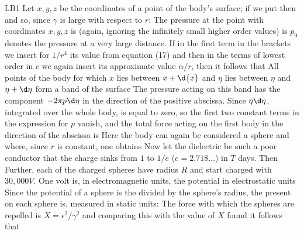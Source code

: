 \begin{paper}{LB1}
Let $x,y,z$ be the coordinates of a point of the body's surface; if we put
then
and so, since $\gamma$ is large with respect to $r$:
The pressure at the point with coordinates $x,y,z$ is (again, ignoring the infinitely small higher order values) is
$p_0$ denotes the pressure at a very large distance. If in the first term in the brackets we insert for $1/r^4$ its value from equation (17) and then in the terms of lowest order in $c$ we again insert its approximate value $\alpha/r$, then it follows that
All points of the body for which $x$ lies between $x+\d{x}$ and $\eta$ lies between $\eta$ and $\eta+\d\eta$ form a band of the surface
The pressure acting on this band has the component $-2\pi p\d\eta$ in the direction of the positive abscissa. Since $\eta\d\eta$, integrated over the whole body, is equal to zero, so the first two constant terms in the expression for $p$ vanish, and the total force acting on the first body in the direction of the abscissa is
Here the body can again be considered a sphere and
where, since $r$ is constant, one obtains
Now let the dielectric be such a poor conductor that the charge sinks from $1$ to $1/e$ ($e=2.718\dots$) in $T$ days. Then
Further, each of the charged spheres have radius $R$ and start charged with $30,000\unit{V}$. One volt is, in electromagnetic units, the potential
in electrostatic units
Since the potential of a sphere is the  divided by the sphere's radius, the  present on each sphere is, measured in static units:
The force with which the spheres are repelled is $X=\epsilon^2/\gamma^2$ and comparing this with the value of $X$ found it follows that

\end{paper}
